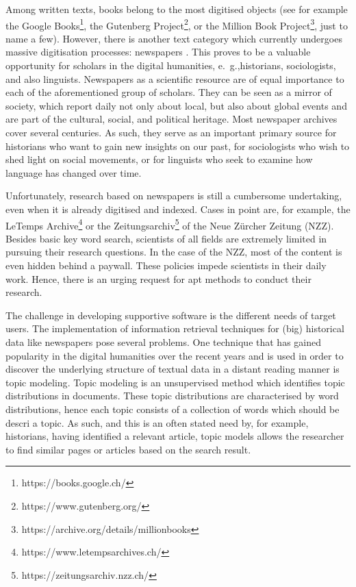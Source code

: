 Among written texts, books belong to the most digitised objects (see for example the Google Books\footnote{https://books.google.ch/}, the Gutenberg Project\footnote{https://www.gutenberg.org/}, or the Million Book Project\footnote{https://archive.org/details/millionbooks}, just to name a few). However, there is another text category which currently undergoes massive digitisation processes: newspapers \citep{lansdall-welfarecontent2017,prestondigital2016,binghamdigitization2010}. This proves to be a valuable opportunity for scholars in the digital humanities, e.~g.,historians, sociologists, and also linguists. Newspapers as a scientific resource are of equal importance to each of the aforementioned group of scholars. They can be seen as a mirror of society, which report daily not only about local, but also about global events and are part of the cultural, social, and political heritage. Most newspaper archives cover several centuries. As such, they serve as an important primary source for historians who want to gain new insights on our past, for sociologists who wish to shed light on social movements, or for linguists who seek to examine how language has changed over time.

Unfortunately, research based on newspapers is still a cumbersome undertaking, even when it is already digitised and indexed. Cases in point are, for example, the LeTemps Archive\footnote{https://www.letempsarchives.ch/} or the Zeitungsarchiv\footnote{https://zeitungsarchiv.nzz.ch/} of the Neue Zürcher Zeitung (NZZ). Besides basic key word search, scientists of all fields are extremely limited in pursuing their research questions. In the case of the NZZ, most of the content is even hidden behind a paywall. These policies impede scientists in their daily work. Hence, there is an urging request for apt methods to conduct their research.

The challenge in developing supportive software is the different needs of target users. The implementation of information retrieval techniques for (big) historical data like newspapers pose several problems. One technique that has gained popularity in the digital humanities over the recent years and is used in order to discover the underlying structure of textual data in a distant reading manner is topic modeling\citep{Yang:2011:TMH:2107636.2107649,weingart2012}. Topic modeling is an unsupervised method which identifies topic distributions in documents. These topic distributions are characterised by word distributions, hence each topic consists of a collection of words which should be descri a topic. As such, and this is an often stated need by, for example, historians, having identified a relevant article, topic models allows the researcher to find similar pages or articles based on the search result.

